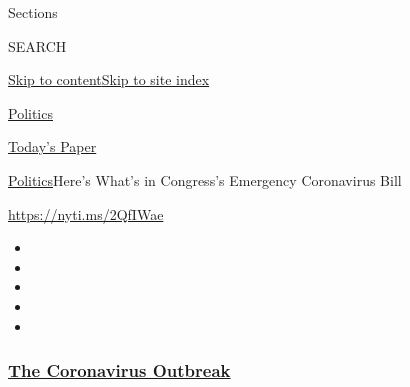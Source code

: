 Sections

SEARCH

\protect\hyperlink{site-content}{Skip to
content}\protect\hyperlink{site-index}{Skip to site index}

\href{https://www.nytimes3xbfgragh.onion/section/politics}{Politics}

\href{https://myaccount.nytimes3xbfgragh.onion/auth/login?response_type=cookie\&client_id=vi}{}

\href{https://www.nytimes3xbfgragh.onion/section/todayspaper}{Today's
Paper}

\href{/section/politics}{Politics}\textbar{}Here's What's in Congress's
Emergency Coronavirus Bill

\url{https://nyti.ms/2QfIWae}

\begin{itemize}
\item
\item
\item
\item
\item
\end{itemize}

\hypertarget{the-coronavirus-outbreak}{%
\subsubsection{\texorpdfstring{\href{https://www.nytimes3xbfgragh.onion/news-event/coronavirus?name=styln-coronavirus-national\&region=TOP_BANNER\&block=storyline_menu_recirc\&action=click\&pgtype=Article\&impression_id=435b24c0-f27a-11ea-9b1f-ab8611e6ed59\&variant=undefined}{The
Coronavirus
Outbreak}}{The Coronavirus Outbreak}}\label{the-coronavirus-outbreak}}

